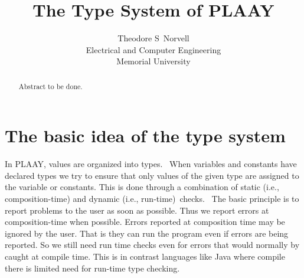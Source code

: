 \documentclass{article}
\begin{document}
\title{The Type System of PLAAY}
\author{Theodore S\ Norvell \\
Electrical and Computer Engineering\\
Memorial University}
\maketitle

\begin{abstract}
Abstract to be done.
\end{abstract}

\section{The basic idea of the type system}

In PLAAY, values are organized into types. \ When variables and constants
have declared types we try to ensure that only values of the given type are
assigned to the variable or constants. This is done through a combination of
static (i.e., composition-time) and dynamic (i.e., run-time)\ checks. \ The
basic principle is to report problems to the user as soon as possible. Thus
we report errors at composition-time when possible. Errors reported at
composition time may be ignored by the user. That is they can run the
program even if errors are being reported. So we still need run time checks
even for errors that would normally by caught at compile time. This is in
contrast languages like Java where compile there is limited need for
run-time type checking.
\end{document}

